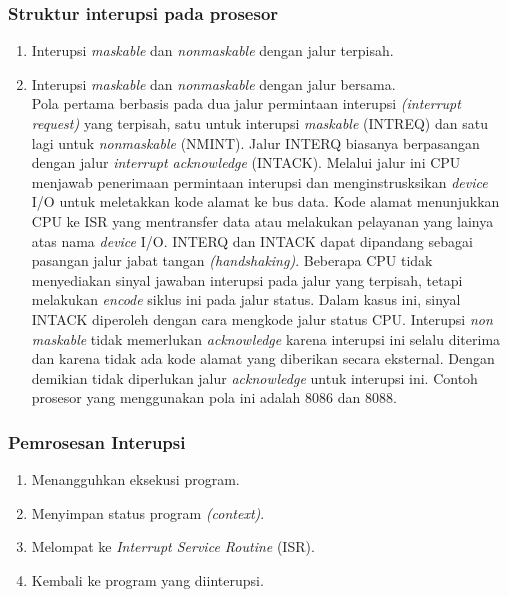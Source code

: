 \documentclass[12pt]{article}
\begin{document}
\subsubsection{Struktur interupsi pada prosesor}
\begin{enumerate}
    \item Interupsi \textit{maskable} dan \textit{nonmaskable} dengan jalur terpisah.
\item Interupsi \textit{maskable} dan \textit{nonmaskable} dengan jalur bersama.\\
    Pola pertama berbasis pada dua jalur permintaan interupsi\textit{ (interrupt request)} yang terpisah, satu untuk interupsi\textit{ maskable} (INTREQ) dan satu lagi untuk \textit{nonmaskable} (NMINT). Jalur INTERQ biasanya berpasangan dengan jalur \textit{interrupt acknowledge }(INTACK). Melalui jalur ini CPU menjawab penerimaan permintaan interupsi dan menginstrusksikan \textit{device} I/O untuk meletakkan kode alamat ke bus data. Kode alamat menunjukkan CPU ke ISR yang mentransfer data atau melakukan pelayanan yang lainya atas nama \textit{device} I/O. INTERQ dan INTACK dapat dipandang sebagai pasangan jalur jabat tangan \textit{(handshaking)}. Beberapa CPU tidak menyediakan sinyal jawaban interupsi pada jalur yang terpisah, tetapi melakukan \textit{encode} siklus ini pada jalur status. Dalam kasus ini, sinyal INTACK diperoleh dengan cara mengkode jalur status CPU. Interupsi \textit{non maskable} tidak memerlukan \textit{acknowledge }karena interupsi ini selalu diterima dan karena tidak ada kode alamat yang diberikan secara eksternal. Dengan demikian tidak diperlukan jalur \textit{acknowledge} untuk interupsi ini. Contoh prosesor yang menggunakan pola ini adalah 8086 dan 8088.
\end{enumerate}
\subsubsection{Pemrosesan Interupsi}
\begin{enumerate}
    \item Menangguhkan eksekusi program.
    \item Menyimpan status program \textit{(context)}.
    \item Melompat ke \textit{Interrupt Service Routine} (ISR).
    \item Kembali ke program yang diinterupsi.
\end{enumerate}
\end{document}
